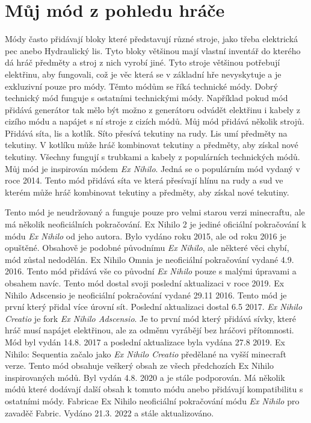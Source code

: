 \documentclass[FM,RP]{tulthesis}
\begin{document}
\chapter{Můj mód z pohledu hráče}
    Módy často přidávají bloky které představují různé stroje, jako třeba elektrická pec anebo Hydraulický lis. Tyto bloky většinou mají vlastní inventář do kterého dá hráč předměty a stroj z nich vyrobí jiné. Tyto stroje většinou potřebují elektřinu, aby fungovali, což je věc která se v základní hře nevyskytuje a je exkluzivní pouze pro módy.
    Těmto módům se říká technické módy. Dobrý technický mód funguje s ostatními technickými módy. Například pokud mód přidává generátor tak mělo být možno z generátoru odvádět elektřinu i kabely z cizího módu a napájet s ní stroje z cizích módů. 
    Můj mód přidává několik strojů. Přidává síta, lis a kotlík. Síto přesívá tekutiny na rudy. Lis umí předměty na tekutiny. V kotlíku může hráč kombinovat tekutiny a předměty, aby získal nové tekutiny.  Všechny fungují s trubkami a kabely z populárních technických módů.
    Můj mód je inspirován módem\textit{ Ex Nihilo}. Jedná se o populárním mód vydaný v roce 2014. Tento mód přidává síta ve která přesívají hlínu na rudy a sud ve kterém může hráč kombinovat tekutiny a předměty, aby získal nové tekutiny.
\begin{comment}
        Zmínit se že tyto mody neměli verzi s a bez elektřiny
\end{comment}
    Tento mód je neudržovaný a funguje pouze pro velmi starou verzi minecraftu, ale má několik neoficiálních pokračování. 
        Ex Nihilo 2 je jediné oficiální pokračování k módu \textit{ Ex Nihilo} od jeho autora. Bylo vydáno roku 2015, ale od roku 2016 je opuštěné. Obsahově je podobné původnímu \textit{Ex Nihilo}, ale některé věci chybí, mód zůstal nedodělán.
        Ex Nihilo Omnia je neoficiální pokračování vydané 4.9. 2016. Tento mód přidává vše co původní \textit{ Ex Nihilo} pouze s malými úpravami a obsahem navíc. Tento mód dostal svoji poslední aktualizaci v roce 2019.
Ex Nihilo Adscensio  je neoficiální pokračování vydané 29.11 2016. Tento mód je první který přidal více úrovní sít. Poslední aktualizaci dostal 6.5 2017.
    \textit{Ex Nihilo Creatio} je fork \textit{Ex Nihilo Adscensio}. Je to první mód který přidává sívky, které hráč musí napájet elektřinou, ale za odměnu vyrábějí bez hráčovi přítomnosti. Mód byl vydán 14.8. 2017 a poslední aktualizace byla vydána 27.8 2019.
    Ex Nihilo: Sequentia začalo jako  \textit{Ex Nihilo Creatio} předělané na vyšší minecraft verze. Tento mód obsahuje veškerý obsah ze všech předchozích Ex Nihilo inspirovaných módů. Byl vydán 4.8. 2020 a je stále podporován. Má několik módů které dodávají další obsah k tomuto módu anebo přidávají kompatibilitu s ostatními módy. 
    Fabricae Ex Nihilo neoficiální pokračování módu  \textit{Ex Nihilo} pro zavaděč Fabric. Vydáno 21.3. 2022 a stále aktualizováno.
\end{document}
